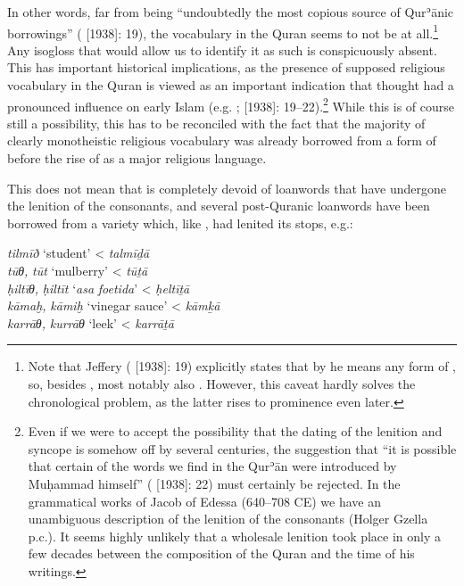 \documentclass[output=paper]{langsci/langscibook}
\begin{document}
In other words, far from  being “undoubtedly the most copious source of Qurʾānic borrowings” (\citealt{Jeffrey2007} [1938]: 19), the  vocabulary in the {Quran} seems to not be  at all.\footnote{Note that Jeffery (\citeyear{Jeffrey2007} [1938]: 19) explicitly states that by  he means any form of  , so, besides , most notably also . However, this caveat hardly solves the chronological problem, as the latter rises to prominence even later.} Any isogloss that would allow us to identify it as such is conspicuously absent. This has important historical implications, as the presence of supposed  religious vocabulary in the {Quran} is viewed as an important indication that   thought had a pronounced influence on early Islam (e.g. \citealt[82--90]{Mingana1927}; \citealt{Jeffrey2007} [1938]: 19--22).\footnote{Even if we were to accept the possibility that the dating of the lenition and syncope is somehow off by several centuries, the suggestion that “it is possible that certain of the  words we find in the Qurʾān were introduced by Muḥammad himself” (\citealt{Jeffrey2007} [1938]: 22) must certainly be rejected. In the grammatical works of Jacob of Edessa (640–708 CE) we have an unambiguous description of the lenition of the consonants (Holger Gzella p.c.). It seems highly unlikely that a wholesale lenition took place in only a few decades between the composition of the {Quran} and the time of his writings.} While this is of course still a possibility, this has to be reconciled with the fact that the majority of clearly monotheistic religious vocabulary was already borrowed from a form of  before the rise of  as a major religious language.

This does not mean that  is completely devoid of  {loanwords} that have undergone the lenition of the consonants, and several post-Quranic {loanwords} have been borrowed from a variety which, like , had lenited its stops, e.g.:

\ea
\ea\textit{tilmīð} ‘student’ <  \textit{talmīḏā}  \citep[254]{Fraenkel1886}\\
\ex\textit{tūθ,} \textit{tūt} ‘mulberry’ <  \textit{tūṯā}  \citep[140]{Fraenkel1886}\\
\ex\textit{ḥiltīθ,} \textit{ḥiltīt} ‘\textit{asa} \textit{foetida}’ <  \textit{ḥeltīṯā} \citep[140]{Fraenkel1886}\\
\ex\textit{kāmaḫ,} \textit{kāmiḫ} ‘vinegar sauce’ <  \textit{kāmḵā} \citep[288]{Fraenkel1886}\\
\ex\textit{karrāθ,} \textit{kurrāθ} ‘leek’ <  \textit{karrāṯā} \citep[144]{Fraenkel1886}
\z
\z
\end{document}
